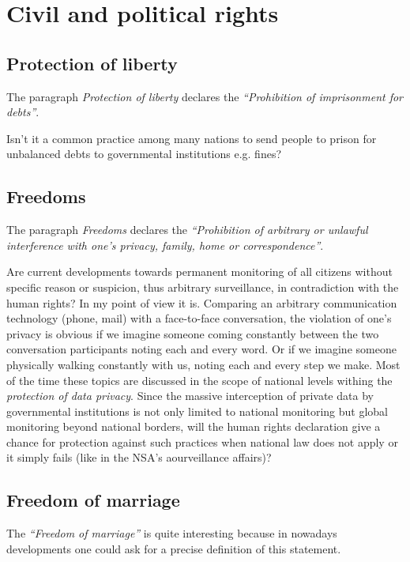 \section{Civil and political rights}
\subsection{Protection of liberty}
The paragraph \emph{Protection of liberty} declares the \emph{``Prohibition of
imprisonment for debts''}.
\cite[p. 20]{tfohr}

Isn't it a common practice among many nations to send people to prison for
unbalanced debts to governmental institutions e.g. fines?
\cite{busse}

\subsection{Freedoms}
The paragraph \emph{Freedoms} declares the \emph{``Prohibition of arbitrary or
unlawful interference with one's privacy, family, home or correspondence''}.
\cite[p. 20]{tfohr}

Are current developments towards permanent monitoring of all citizens without
specific reason or suspicion, thus arbitrary surveillance, in contradiction
with the human rights? In my point of view it is. Comparing an arbitrary
communication technology (phone, mail) with a face-to-face conversation, the
violation of one's privacy is obvious if we imagine someone coming constantly
between the two conversation participants noting each and every word. Or if we
imagine someone physically walking constantly with us, noting each and every
step we make. Most of the time these topics are discussed in the scope of
national levels withing the \emph{protection of data privacy}. Since the
massive interception of private data by governmental institutions is not only
limited to national monitoring but global monitoring beyond national borders,
will the human rights declaration give a chance for protection against such
practices when national law does not apply or it simply fails (like in the
NSA's aourveillance affairs)?
\cite{nsa}

\subsection{Freedom of marriage}
The \emph{``Freedom of marriage''} is quite interesting because in nowadays
developments one could ask for a precise definition of this statement.
\cite[p. 20]{tfohr}

